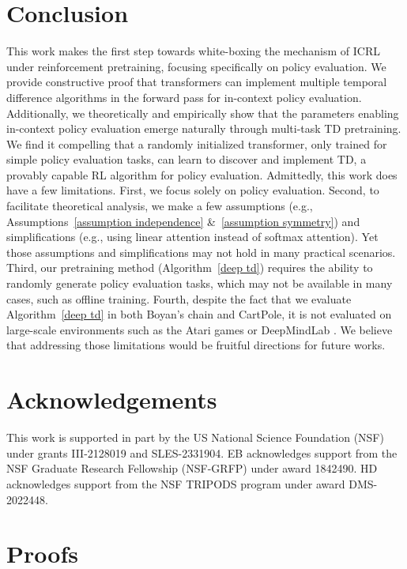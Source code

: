 \documentclass{article}
\newcommand{\newtext}[1]{{#1}}
\begin{document}
\section{Conclusion}
This work makes the first step towards white-boxing the mechanism of ICRL under reinforcement pretraining, focusing specifically on policy evaluation.
We provide constructive proof that transformers can implement multiple temporal difference algorithms in the forward pass for in-context policy evaluation.
Additionally, we theoretically and empirically show that the parameters enabling in-context policy evaluation emerge naturally through multi-task TD pretraining.
We find it compelling that a randomly initialized transformer, only trained for simple policy evaluation tasks, can learn to discover and implement TD, a provably capable RL algorithm for policy evaluation.
\newtext{Admittedly, this work does have a few limitations.
First, we focus solely on policy evaluation.
Second,
to facilitate theoretical analysis,
we make a few assumptions (e.g., Assumptions~\ref{assumption independence} \&~\ref{assumption symmetry}) and simplifications (e.g., using linear attention instead of softmax attention).
Yet those assumptions and simplifications may not hold in many practical scenarios.
Third,
our pretraining method (Algorithm~\ref{deep td}) requires the ability to randomly generate policy evaluation tasks,
which may not be available in many cases, such as offline training.
Fourth,
despite the fact that we evaluate Algorithm~\ref{deep td} in both Boyan's chain and CartPole,
it is not evaluated on large-scale environments such as the Atari games \citep{bellemare13arcade} or DeepMindLab \citep{beattie2016deepmind}.
We believe that addressing those limitations would be fruitful directions for future works.}
\section*{Acknowledgements}
This work is supported in part by the US National Science Foundation (NSF) under grants III-2128019 and SLES-2331904. EB acknowledges support from the NSF Graduate Research Fellowship (NSF-GRFP) under award 1842490.
HD acknowledges support from the NSF TRIPODS program under award DMS-2022448.


\newpage
\appendix
\tableofcontents
\newpage
\section{Proofs}
\end{document}
